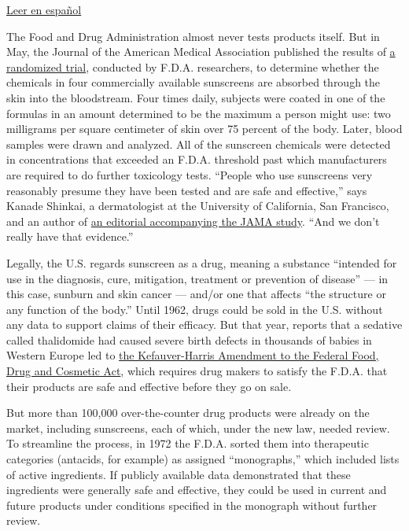 \href{https://www.nytimes3xbfgragh.onion/es/2019/08/08/espanol/estilos-de-vida/protector-solar.html}{Leer
en español}

The Food and Drug Administration almost never tests products itself. But
in May, the Journal of the American Medical Association published the
results of
\href{https://jamanetwork.com/journals/jama/article-abstract/2733085}{a
randomized trial}, conducted by F.D.A. researchers, to determine whether
the chemicals in four commercially available sunscreens are absorbed
through the skin into the bloodstream. Four times daily, subjects were
coated in one of the formulas in an amount determined to be the maximum
a person might use: two milligrams per square centimeter of skin over 75
percent of the body. Later, blood samples were drawn and analyzed. All
of the sunscreen chemicals were detected in concentrations that exceeded
an F.D.A. threshold past which manufacturers are required to do further
toxicology tests. ``People who use sunscreens very reasonably presume
they have been tested and are safe and effective,'' says Kanade Shinkai,
a dermatologist at the University of California, San Francisco, and an
author of
\href{https://jamanetwork.com/journals/jama/article-abstract/2733084?widget=personalizedcontent\&previousarticle=2733085}{an
editorial accompanying the JAMA study}. ``And we don't really have that
evidence.''

Legally, the U.S. regards sunscreen as a drug, meaning a substance
``intended for use in the diagnosis, cure, mitigation, treatment or
prevention of disease'' --- in this case, sunburn and skin cancer ---
and/or one that affects ``the structure or any function of the body.''
Until 1962, drugs could be sold in the U.S. without any data to support
claims of their efficacy. But that year, reports that a sedative called
thalidomide had caused severe birth defects in thousands of babies in
Western Europe led to
\href{https://www.fda.gov/consumers/consumer-updates/kefauver-harris-amendments-revolutionized-drug-development}{the
Kefauver-Harris Amendment to the Federal Food, Drug and Cosmetic Act},
which requires drug makers to satisfy the F.D.A. that their products are
safe and effective before they go on sale.

But more than 100,000 over-the-counter drug products were already on the
market, including sunscreens, each of which, under the new law, needed
review. To streamline the process, in 1972 the F.D.A. sorted them into
therapeutic categories (antacids, for example) as assigned
``monographs,'' which included lists of active ingredients. If publicly
available data demonstrated that these ingredients were generally safe
and effective, they could be used in current and future products under
conditions specified in the monograph without further review.

